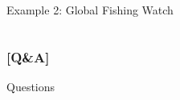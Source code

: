 \documentclass[xcolor=x11names, aspectratio=169, compress]{beamer}
\renewcommand{\(}{\begin{columns}}
\renewcommand{\)}{\end{columns}}
\newcommand{\<}[1]{\begin{column}{#1}}
\renewcommand{\>}{\end{column}}
\begin{document}
\begin{frame}{Example 2: Global Fishing Watch }
\begin{columns}[T]
\begin{column}{0.4\textwidth}
\begin{center}
\begin{itemize}

   \end{itemize}
    \end{center}
    \end{column}
\end{columns}
\end{frame}



\begin{frame} %
\frametitle{\textcolor{brique}{[Q\&A]}}
\begin{center}
\Large \textcolor{siap}{ Questions}
\end{center}
\end{frame}
\end{document}
